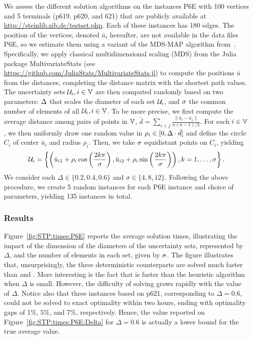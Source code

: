 \documentclass[12pt]{article}
\newcommand{\blue}[1]{{\color{black}#1}}
\begin{document}
We assess the different solution algorithms on the instances P6E with 100 vertices and 5 terminals (p619, p620, and 621) that are publicly available at \url{http://steinlib.zib.de/testset.php}. Each of these instances has 180 edges. The position of the vertices, denoted $\bar{u}_i$ hereafter, are not available in the data files P6E, so we estimate them using a variant of the MDS-MAP algorithm from~\cite{shang2003localization}. 
Specifically, we apply classical multidimensional scaling (MDS) from the Julia package MultivariateStats (see \url{https://github.com/JuliaStats/MultivariateStats.jl}) to compute the positions $\bar{u}$ from the distances, completing the distance matrix with the shortest path values.
The uncertainty sets $\mathcal{U}_i, i\in \mathbb{V}$ are then computed randomly based on two parameters: $\Delta$ that scales the diameter of each set $\mathcal{U}_i$, and $\sigma$ the common number of elements of all $\mathcal{U}_i, i\in \mathbb{V}$. 
To be more precise, we first compute the average distance among pairs of points in $\mathbb{V}$, $\bar{d}=\sum_{i< j}\frac{\|\bar{u}_i-\bar{u}_j\|}{n(n-1)/2}$. 
For each $i\in\mathbb{V}$, we then uniformly draw one random value in $\rho_i\in [0,\Delta \cdot\bar{d}]$ and define the circle $C_i$ of center $\bar{u}_i$ and radius $\rho_i$. Then, we take $\sigma$ equidistant points on $C_i$, yielding
$$
\mathcal{U}_i=\left\{\left(\bar{u}_{i1}+\rho_i\cos\left(\frac{2 k\pi}{\sigma}\right),\bar{u}_{i2}+\rho_i\sin\left(\frac{2 k\pi}{\sigma}\right)\right), k=1,\ldots,\sigma\right\}.
$$
\blue{We consider each $\Delta\in\{0.2,0.4,0.6\}$ and $\sigma\in\{4,8,12\}$.}
 Following the above procedure, we create 5 random instances for each P6E instance and choice of parameters, yielding 135 instances in total. 

\subsubsection{Results}

Figure~\ref{fig:STP:times:P6E} reports the average solution times, illustrating the impact of the dimension of the diameters of the uncertainty sets, represented by $\Delta$, and the number of elements in each set, given by $\sigma$. The figure illustrates that, unsurprisingly, the three deterministic counterparts are solved much faster than \cons{} and \exact{}. More interesting is the fact that \exact{} is faster than the heuristic algorithm \cons{} when $\Delta$ is small. However, the difficulty of solving \exact{} grows rapidly with the value of $\Delta$. Notice also that three instances based on p621, corresponding to $\Delta=0.6$, could not be solved to exact optimality within two hours, ending with optimality gaps of 1\%, 5\%, and 7\%, respectively. Hence, the value reported on Figure~\ref{fig:STP:times:P6E:Delta} for $\Delta=0.6$ is actually a lower bound for the true average value.
\end{document}
